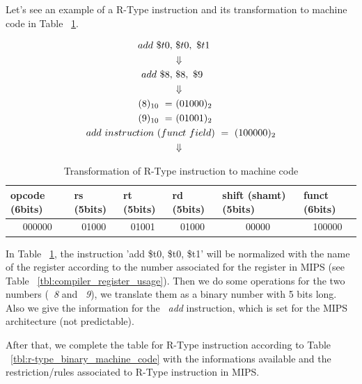 \documentclass[
  oneside,
  11pt, a4paper,
  footinclude=true,
  headinclude=true,
  cleardoublepage=empty
]{scrbook}
\begin{document}
Let's see an example of a R-Type instruction and its transformation to machine code in Table ~\ref{tbl:r-type_transformation2machine_code}.


\newpage

\begin{align*}
  add\ \$t0,&\ \$t0,\ \$t1\\
  &\makebox[\widthof{${}={}$}]{$\Downarrow$} \\
  add\ \$8,&\ \$8,\ \$9\\
  &\makebox[\widthof{${}={}$}]{$\Downarrow$} \\
  (8)_{10}\ =&\ (01000)_{2}\\
  (9)_{10}\ =&\ (01001)_{2}\\
  add\ instruction\ (fu&nct\ field)\ =\ (100000)_{2}\\
  &\makebox[\widthof{${}={}$}]{$\Downarrow$}
\end{align*}

\vspace{-7mm}
\begin{table}[h!]
\centering
\begin{tabular}{|l|l|l|l|l|l|}
\hline
\textbf{opcode (6bits)}      & \textbf{rs (5bits)}        & \textbf{rt (5bits)}        & \textbf{rd (5bits)}        & \textbf{shift (shamt) (5bits)} & \textbf{funct (6bits)}     \\ \hline
\multicolumn{1}{|c|}{000000} & \multicolumn{1}{c|}{01000} & \multicolumn{1}{c|}{01001} & \multicolumn{1}{c|}{01000} & \multicolumn{1}{c|}{00000}     & \multicolumn{1}{c|}{100000} \\ \hline
\end{tabular}
\caption{Transformation of R-Type instruction to machine code}
\label{tbl:r-type_transformation2machine_code}
\end{table}

In Table ~\ref{tbl:r-type_transformation2machine_code}, the instruction 'add \$t0, \$t0, \$t1' will be normalized with the name of the register according to the number associated for the register in MIPS (see Table ~\ref{tbl:compiler_register_usage}). Then we do some operations for the two numbers (~\textit{8} and ~\textit{9}), we translate them as a binary number with 5 bits long. Also we give the information for the ~\textit{add} instruction, which is set for the MIPS architecture (not predictable).


After that, we complete the table for R-Type instruction according to Table ~\ref{tbl:r-type_binary_machine_code} with the informations available and the restriction/rules associated to R-Type instruction in MIPS.
\end{document}
